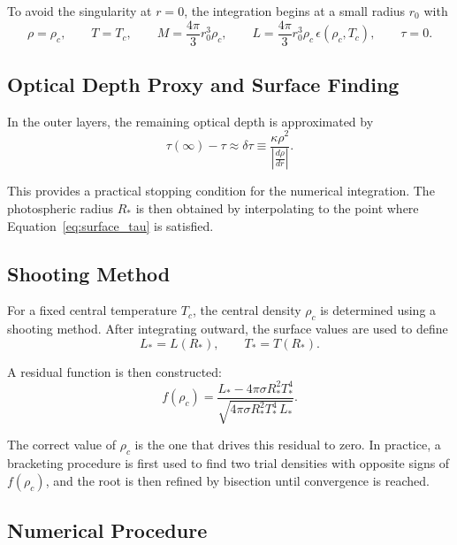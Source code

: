 \documentclass[12pt]{article}
\begin{document}
To avoid the singularity at $r=0$, the integration begins at a small radius $r_0$ with
\begin{equation}
\rho=\rho_c,
\qquad
T=T_c,
\qquad
M=\frac{4\pi}{3}r_0^3\rho_c,
\qquad
L=\frac{4\pi}{3}r_0^3\rho_c\,\epsilon(\rho_c,T_c),
\qquad
\tau=0.
\label{eq:initial_conditions}
\end{equation}

\subsection{Optical Depth Proxy and Surface Finding}

In the outer layers, the remaining optical depth is approximated by
\begin{equation}
\tau(\infty)-\tau \approx \delta\tau
\equiv
\frac{\kappa \rho^2}{\left|\frac{d\rho}{dr}\right|}.
\label{eq:delta_tau}
\end{equation}

This provides a practical stopping condition for the numerical integration. The photospheric radius $R_\ast$ is then obtained by interpolating to the point where Equation~\eqref{eq:surface_tau} is satisfied.

\subsection{Shooting Method}

For a fixed central temperature $T_c$, the central density $\rho_c$ is determined using a shooting method. After integrating outward, the surface values are used to define
\begin{equation}
L_\ast = L(R_\ast),
\qquad
T_\ast = T(R_\ast).
\end{equation}

A residual function is then constructed:
\begin{equation}
f(\rho_c)
=
\frac{L_\ast - 4\pi\sigma R_\ast^2 T_\ast^4}
{\sqrt{4\pi\sigma R_\ast^2 T_\ast^4 \, L_\ast}}.
\label{eq:shooting_function}
\end{equation}

The correct value of $\rho_c$ is the one that drives this residual to zero. In practice, a bracketing procedure is first used to find two trial densities with opposite signs of $f(\rho_c)$, and the root is then refined by bisection until convergence is reached.

\subsection{Numerical Procedure}
\end{document}

